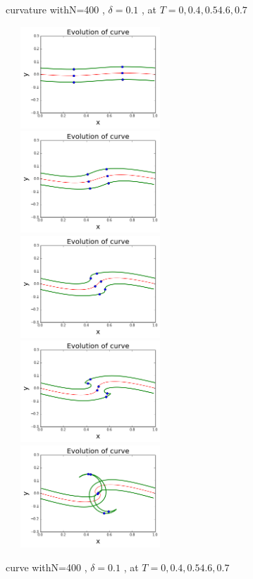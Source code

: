 \documentclass[12pt,twoside]{article}
\begin{document}
\begin{figure}[ht]
\begin{minipage}[b]{0.45\linewidth}
\caption{curvature withN=400 , $\delta=0.1$ , at  $T=0,0.4,0.54.6,0.7$}
\end{minipage}
\quad
\begin{minipage}[b]{0.45\linewidth}
\includegraphics[width=2.5in,height=1.5in]{curveT0.png}
\includegraphics[width=2.5in,height=1.5in]{curveT04.png}
\includegraphics[width=2.5in,height=1.5in]{curveT054.png}
\includegraphics[width=2.5in,height=1.5in]{curveT06.png}
\includegraphics[width=2.5in,height=1.5in]{curveT07.png}
\caption{curve withN=400 , $\delta=0.1$ , at  $T=0,0.4,0.54.6,0.7$}

\end{minipage}
\end{figure}
\end{document}
